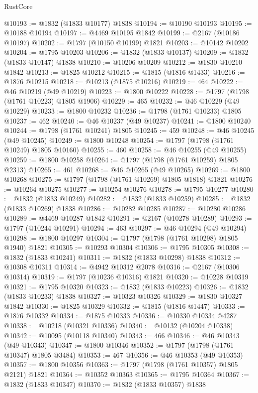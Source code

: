 \begin{lexlean}{RustCore}
\begin{coremodule}
@10193 := @1832 (@1833 @10177) @1838
@10194 := @10190 @10193
@10195 := @10188 @10194
@10197 := @4469 @10195 @1842
@10199 := @2167 (@10186 @10197)
@10202 := @1797 (@10150 @10199) @1821
@10203 := @10142 @10202
@10204 := @1795 @10203
@10206 := @1832 (@1833 @10137)
@10209 := @1832 (@1833 @10147) @1838
@10210 := @10206 @10209
@10212 := @1830 @10210 @1842
@10213 := @1825 @10212
@10215 := @1815 (@1816 @1433)
@10216 := @1876 @10215
@10218 := @10213 (@1875 @10216)
@10219 := 464
@10222 := @46 @10219 (@49 @10219)
@10223 := @1800 @10222
@10228 := @1797 (@1798 (@1761 @10223) @1805 @1906)
@10229 := 465
@10232 := @46 @10229 (@49 @10229)
@10233 := @1800 @10232
@10236 := @1798 (@1761 @10233) @1805
@10237 := 462
@10240 := @46 @10237 (@49 @10237)
@10241 := @1800 @10240
@10244 := @1798 (@1761 @10241) @1805
@10245 := 459
@10248 := @46 @10245 (@49 @10245)
@10249 := @1800 @10248
@10254 := @1797 (@1798 (@1761 @10249) @1805 @10160)
@10255 := 460
@10258 := @46 @10255 (@49 @10255)
@10259 := @1800 @10258
@10264 := @1797 (@1798 (@1761 @10259) @1805 @2313)
@10265 := 461
@10268 := @46 @10265 (@49 @10265)
@10269 := @1800 @10268
@10275 := @1797 (@1798 (@1761 @10269) @1805 @1818) @1821
@10276 := @10264 @10275
@10277 := @10254 @10276
@10278 := @1795 @10277
@10280 := @1832 (@1833 @10249)
@10282 := @1832 (@1833 @10259)
@10285 := @1832 (@1833 @10269) @1838
@10286 := @10282 @10285
@10287 := @10280 @10286
@10289 := @4469 @10287 @1842
@10291 := @2167 (@10278 @10289)
@10293 := @1797 (@10244 @10291)
@10294 := 463
@10297 := @46 @10294 (@49 @10294)
@10298 := @1800 @10297
@10304 := @1797 (@1798 (@1761 @10298) @1805 @1940) @1821
@10305 := @10293 @10304
@10306 := @1795 @10305
@10308 := @1832 (@1833 @10241)
@10311 := @1832 (@1833 @10298) @1838
@10312 := @10308 @10311
@10314 := @4942 @10312 @2078
@10316 := @2167 (@10306 @10314)
@10319 := @1797 (@10236 @10316) @1821
@10320 := @10228 @10319
@10321 := @1795 @10320
@10323 := @1832 (@1833 @10223)
@10326 := @1832 (@1833 @10233) @1838
@10327 := @10323 @10326
@10329 := @1830 @10327 @1842
@10330 := @1825 @10329
@10332 := @1815 (@1816 @1447)
@10333 := @1876 @10332
@10334 := @1875 @10333
@10336 := @10330 @10334 @4287
@10338 := @10218 (@10321 @10336)
@10340 := @10132 (@10204 @10338)
@10342 := @10095 (@10118 @10340)
@10343 := 466
@10346 := @46 @10343 (@49 @10343)
@10347 := @1800 @10346
@10352 := @1797 (@1798 (@1761 @10347) @1805 @3484)
@10353 := 467
@10356 := @46 @10353 (@49 @10353)
@10357 := @1800 @10356
@10363 := @1797 (@1798 (@1761 @10357) @1805 @2121) @1821
@10364 := @10352 @10363
@10365 := @1795 @10364
@10367 := @1832 (@1833 @10347)
@10370 := @1832 (@1833 @10357) @1838

\end{coremodule}
\end{lexlean}
